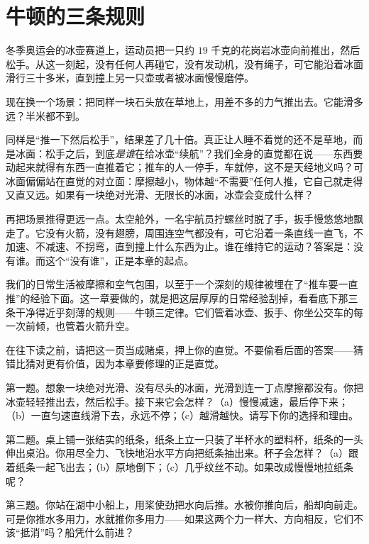 \chapter{牛顿的三条规则}


\begin{mainline}
冬季奥运会的冰壶赛道上，运动员把一只约 \(19\) 千克的花岗岩冰壶向前推出，然后松手。从这一刻起，没有任何人再碰它，没有发动机，没有绳子，可它能沿着冰面滑行三十多米，直到撞上另一只壶或者被冰面慢慢磨停。

现在换一个场景：把同样一块石头放在草地上，用差不多的力气推出去。它能滑多远？半米都不到。

同样是“推一下然后松手”，结果差了几十倍。真正让人睡不着觉的还不是草地，而是冰面：松手之后，到底\emph{是谁}在给冰壶“续航”？我们全身的直觉都在说——东西要动起来就得有东西一直推着它；推车的人一停手，车就停，这不是天经地义吗？可冰面偏偏站在直觉的对立面：摩擦越小，物体越“不需要”任何人推，它自己就走得又直又远。如果有一块绝对光滑、无限长的冰面，冰壶会变成什么样？

再把场景推得更远一点。太空舱外，一名宇航员拧螺丝时脱了手，扳手慢悠悠地飘走了。它没有火箭，没有翅膀，周围连空气都没有，可它沿着一条直线一直飞，不加速、不减速、不拐弯，直到撞上什么东西为止。谁在维持它的运动？答案是：没有谁。而这个“没有谁”，正是本章的起点。

我们的日常生活被摩擦和空气包围，以至于一个深刻的规律被埋在了“推车要一直推”的经验下面。这一章要做的，就是把这层厚厚的日常经验刮掉，看看底下那三条干净得近乎刻薄的规则——牛顿三定律。它们管着冰壶、扳手、你坐公交车的每一次前倾，也管着火箭升空。
\end{mainline}


在往下读之前，请把这一页当成赌桌，押上你的直觉。不要偷看后面的答案——猜错比猜对更有价值，因为本章要修理的正是直觉。

第一题。想象一块绝对光滑、没有尽头的冰面，光滑到连一丁点摩擦都没有。你把冰壶轻轻推出去，然后松手。接下来它会怎样？（a）慢慢减速，最后停下来；（b）一直匀速直线滑下去，永远不停；（c）越滑越快。请写下你的选择和理由。

第二题。桌上铺一张结实的纸条，纸条上立一只装了半杯水的塑料杯，纸条的一头伸出桌沿。你用尽全力、飞快地沿水平方向把纸条抽出来。杯子会怎样？（a）跟着纸条一起飞出去；（b）原地倒下；（c）几乎纹丝不动。如果改成慢慢地拉纸条呢？

第三题。你站在湖中小船上，用桨使劲把水向后推。水被你推向后，船却向前走。可是你推水多用力，水就推你多用力——如果这两个力一样大、方向相反，它们不该“抵消”吗？船凭什么前进？

